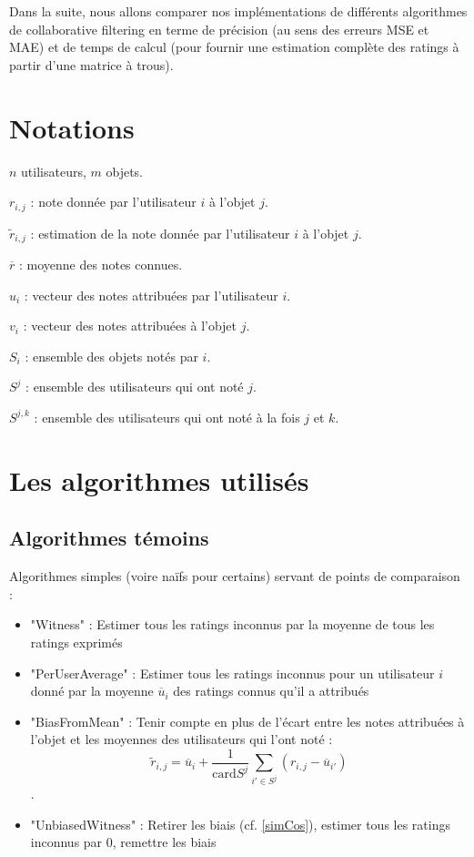 \documentclass[11pt, openany, a4paper]{article}
\newcommand{\card}{\mathrm{card}}
\begin{document}
Dans la suite, nous allons comparer nos implémentations de différents algorithmes de collaborative filtering en terme de précision (au sens des erreurs MSE et MAE) et de temps de calcul (pour fournir une estimation complète des ratings à partir d'une matrice à trous).


\tableofcontents

\section*{Notations}

$n$ utilisateurs, $m$ objets.

$r_{i,j}$ : note donnée par l'utilisateur $i$ à l'objet $j$.

$\tilde r_{i,j}$ : estimation de la note donnée par l'utilisateur $i$ à l'objet $j$.

$\overline r$ : moyenne des notes connues.

$u_i$ : vecteur des notes attribuées par l'utilisateur $i$.

$v_i$ : vecteur des notes attribuées à l'objet $j$.

$S_i$ : ensemble des objets notés par $i$.

$S^j$ : ensemble des utilisateurs qui ont noté $j$.

$S^{j,k}$ : ensemble des utilisateurs qui ont noté à la fois $j$ et $k$.

\section{Les algorithmes utilisés}
	\subsection{Algorithmes témoins}
		Algorithmes simples (voire naïfs pour certains) servant de points de comparaison : 
			\begin{itemize}
				\item{"Witness" : Estimer tous les ratings inconnus par la moyenne de tous les ratings exprimés}
				\item{"PerUserAverage" : Estimer tous les ratings inconnus pour un utilisateur $i$ donné par la moyenne $\overline u_i$ des ratings connus qu'il a attribués}
				\item{"BiasFromMean" : Tenir compte en plus de l'écart entre les notes attribuées à l'objet et les moyennes des utilisateurs qui l'ont noté : 
				$$\tilde r_{i,j}=\overline u_i + \frac{1}{\card S^j} \sum\limits_{i'\in S^j} (r_{i,j} - \overline u_{i'})$$.}
				\item{"UnbiasedWitness" : Retirer les biais (cf. \ref{simCos}), estimer tous les ratings inconnus par $0$, remettre les biais}
			\end{itemize}
	
\end{document}
